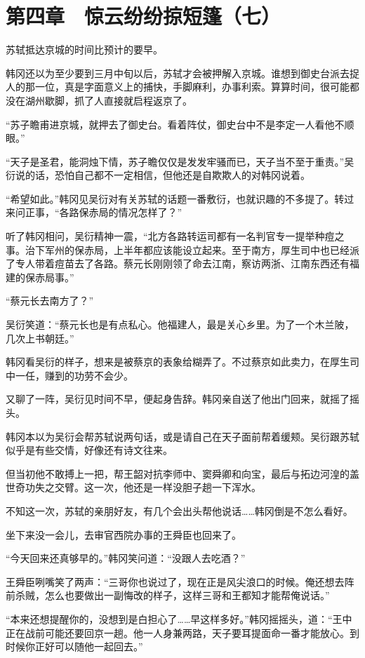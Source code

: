 \section{第四章　惊云纷纷掠短篷（七）}

苏轼抵达京城的时间比预计的要早。

韩冈还以为至少要到三月中旬以后，苏轼才会被押解入京城。谁想到御史台派去捉人的那一位，真是字面意义上的捕快，手脚麻利，办事利索。算算时间，很可能都没在湖州歇脚，抓了人直接就启程返京了。

“苏子瞻甫进京城，就押去了御史台。看着阵仗，御史台中不是李定一人看他不顺眼。”

“天子是圣君，能洞烛下情，苏子瞻仅仅是发发牢骚而已，天子当不至于重责。”吴衍说的话，恐怕自己都不一定相信，但他还是自欺欺人的对韩冈说着。

“希望如此。”韩冈见吴衍对有关苏轼的话题一番敷衍，也就识趣的不多提了。转过来问正事，“各路保赤局的情况怎样了？”

听了韩冈相问，吴衍精神一震，“北方各路转运司都有一名判官专一提举种痘之事。治下军州的保赤局，上半年都应该能设立起来。至于南方，厚生司中也已经派了专人带着痘苗去了各路。蔡元长刚刚领了命去江南，察访两浙、江南东西还有福建的保赤局事。”

“蔡元长去南方了？”

吴衍笑道：“蔡元长也是有点私心。他福建人，最是关心乡里。为了一个木兰陂，几次上书朝廷。”

韩冈看吴衍的样子，想来是被蔡京的表象给糊弄了。不过蔡京如此卖力，在厚生司中一任，赚到的功劳不会少。

又聊了一阵，吴衍见时间不早，便起身告辞。韩冈亲自送了他出门回来，就摇了摇头。

韩冈本以为吴衍会帮苏轼说两句话，或是请自己在天子面前帮着缓颊。吴衍跟苏轼似乎是有些交情，好像还有诗文往来。

但当初他不敢搏上一把，帮王韶对抗李师中、窦舜卿和向宝，最后与拓边河湟的盖世奇功失之交臂。这一次，他还是一样没胆子趟一下浑水。

不知这一次，苏轼的亲朋好友，有几个会出头帮他说话……韩冈倒是不怎么看好。

坐下来没一会儿，去审官西院办事的王舜臣也回来了。

“今天回来还真够早的。”韩冈笑问道：“没跟人去吃酒？”

王舜臣咧嘴笑了两声：“三哥你也说过了，现在正是风尖浪口的时候。俺还想去阵前杀贼，怎么也要做出一副悔改的样子，这样三哥和王都知才能帮俺说话。”

“本来还想提醒你的，没想到是白担心了……早这样多好。”韩冈摇摇头，道：“王中正在战前可能还要回京一趟。他一人身兼两路，天子要耳提面命一番才能放心。到时候你正好可以随他一起回去。”

